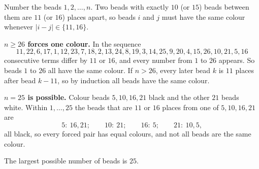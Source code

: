 Number the beads $1,2,\dots,n$. Two beads with exactly $10$ (or $15$) beads between them are $11$ (or $16$) places apart, so beads $i$ and $j$ must have the same colour whenever $|i-j|\in\{11,16\}$.

\textbf{$n\ge26$ forces one colour.} In the sequence
\[
11,22,6,17,1,12,23,7,18,2,13,24,8,19,3,14,25,9,20,4,15,26,10,21,5,16
\]
consecutive terms differ by $11$ or $16$, and every number from $1$ to $26$ appears. So beads $1$ to $26$ all have the same colour. If $n>26$, every later bead $k$ is $11$ places after bead $k-11$, so by induction all beads have the same colour.

\textbf{$n=25$ is possible.} Colour beads $5,10,16,21$ black and the other $21$ beads white. Within $1,\dots,25$ the beads that are $11$ or $16$ places from one of $5,10,16,21$ are
\[
5\colon\ 16,21;\qquad 10\colon\ 21;\qquad 16\colon\ 5;\qquad 21\colon\ 10,5,
\]
all black, so every forced pair has equal colours, and not all beads are the same colour.

The largest possible number of beads is $\boxed{25}$.
